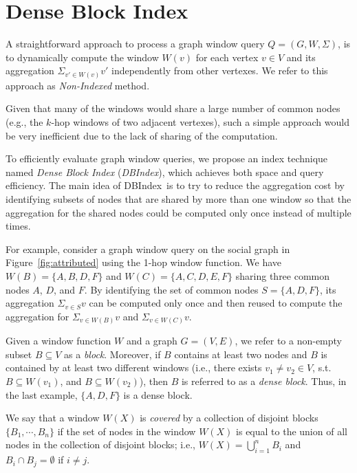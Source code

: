 \newcommand{\DBIndex}{DBIndex}
\newcommand{\blockset}{{\cal B}}
\newcommand{\clusterset}{{\cal C}}
\section{Dense Block Index}\label{gw:sec:db-index}
A straightforward approach to process a graph window query 
$Q = (G, W, \Sigma)$, %
is to dynamically compute the window $W(v)$ for each vertex $v \in V$ and
its aggregation 
$\Sigma_{v' \in W(v)} v'$ 
independently from other vertexes. We refer to this approach as \emph{Non-Indexed} method.

Given that many of the windows would share a large number of common nodes (e.g., the $k$-hop windows of two adjacent 
vertexes),
such a simple approach would be very inefficient due to the lack of sharing of the computation. 

To efficiently evaluate graph window queries, we propose an index technique named \emph{Dense Block Index} (\textit{\DBIndex}), which achieves both space and query efficiency. 
The main idea of \DBIndex\ is to try to reduce the aggregation cost by identifying subsets of nodes that are shared by more than one window 
so that the aggregation for the shared nodes could be computed only once instead of multiple times.

For example, consider a graph window query on the social graph in Figure~\ref{fig:attributed} 
using the 1-hop window function.
We have $W(B) = \{A,B,D,F\}$ and $W(C) = \{A,C,D,E,F\}$ sharing three common nodes $A$, $D$, and $F$.
By identifying the set of common nodes $S=\{A,D,F\}$, its aggregation 
$\Sigma_{v \in S} v$ can be computed only once
and then reused to compute the aggregation for $\Sigma_{v \in W(B)} v$ and $\Sigma_{v \in W(C)} v$.

Given a window function $W$ and a graph $G=(V,E)$,
we refer to a non-empty subset $B \subseteq V$ as a {\it block}.
Moreover, if $B$ contains at least two nodes and $B$ is contained by at least two different windows
(i.e., there exists $v_1 \neq v_2 \in V$, s.t. $B \subseteq W(v_1)$, and $B \subseteq W(v_2)$),
then $B$ is referred to as a {\it dense block}.
Thus, in the last example, $\{A,D,F\}$ is a dense block.

We say that a window $W(X)$ is {\it covered} by a collection of disjoint blocks $\{B_1,\cdots,B_n\}$
if the set of nodes in the window $W(X)$ is equal to the union of all nodes in the collection of disjoint blocks;
i.e., $W(X) = \bigcup_{i=1}^{n} B_i$ and $B_i \cap B_j = \emptyset$ if $i \neq j$.

